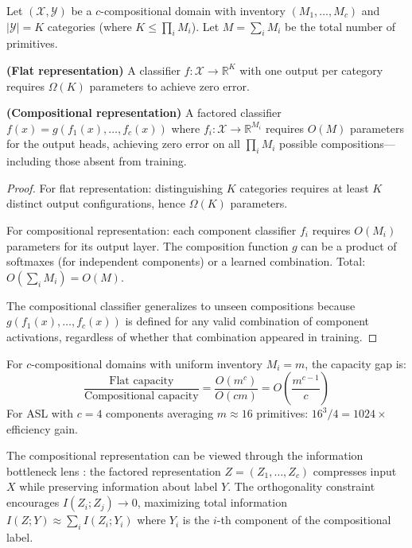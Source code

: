 \documentclass{article}
\begin{document}
\begin{theorem}
\label{thm:capacity_gap}
Let $(\mathcal{X}, \mathcal{Y})$ be a $c$-compositional domain with inventory $(M_1, \ldots, M_c)$ and $|\mathcal{Y}| = K$ categories (where $K \leq \prod_i M_i$). Let $M = \sum_i M_i$ be the total number of primitives.

\textbf{(Flat representation)} A classifier $f: \mathcal{X} \to \mathbb{R}^{K}$ with one output per category requires $\Omega(K)$ parameters to achieve zero error.

\textbf{(Compositional representation)} A factored classifier $f(x) = g(f_1(x), \ldots, f_c(x))$ where $f_i: \mathcal{X} \to \mathbb{R}^{M_i}$ requires $O(M)$ parameters for the output heads, achieving zero error on all $\prod_i M_i$ possible compositions---including those absent from training.
\end{theorem}

\begin{proof}
For flat representation: distinguishing $K$ categories requires at least $K$ distinct output configurations, hence $\Omega(K)$ parameters.

For compositional representation: each component classifier $f_i$ requires $O(M_i)$ parameters for its output layer. The composition function $g$ can be a product of softmaxes (for independent components) or a learned combination. Total: $O(\sum_i M_i) = O(M)$.

The compositional classifier generalizes to unseen compositions because $g(f_1(x), \ldots, f_c(x))$ is defined for any valid combination of component activations, regardless of whether that combination appeared in training.
\end{proof}

\begin{corollary}
For $c$-compositional domains with uniform inventory $M_i = m$, the capacity gap is:
\begin{equation}
\frac{\text{Flat capacity}}{\text{Compositional capacity}} = \frac{O(m^c)}{O(cm)} = O\left(\frac{m^{c-1}}{c}\right)
\end{equation}
For ASL with $c=4$ components averaging $m \approx 16$ primitives: $16^3/4 = 1024\times$ efficiency gain.
\end{corollary}

\begin{remark}
The compositional representation can be viewed through the information bottleneck lens \citep{tishby2000information}: the factored representation $Z = (Z_1, \ldots, Z_c)$ compresses input $X$ while preserving information about label $Y$. The orthogonality constraint encourages $I(Z_i; Z_j) \to 0$, maximizing total information $I(Z; Y) \approx \sum_i I(Z_i; Y_i)$ where $Y_i$ is the $i$-th component of the compositional label.
\end{remark}
\end{document}
